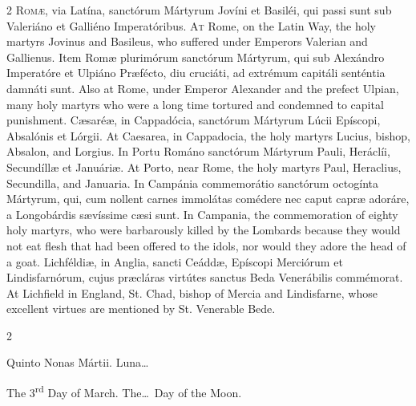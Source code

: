 \begin{paracol}{2}
\lettrine[lines=2]{R}{omæ,} via Latína, sanctórum Mártyrum Jovíni et 
 Basiléi, qui passi sunt sub Valeriáno et Galliéno Imperatóribus.
\switchcolumn
{}
\lettrine[lines=2]{A}{t} Rome, on the Latin Way, the holy martyrs Jovinus and Basileus, who 
 suffered under Emperors Valerian and Gallienus.
\switchcolumn*
{}
Item Romæ plurimórum sanctórum Mártyrum, qui 
 sub Alexándro Imperatóre et Ulpiáno Præfécto, diu cruciáti, ad extrémum 
 capitáli senténtia damnáti sunt.
\switchcolumn
{}
Also at Rome, under Emperor Alexander and the prefect Ulpian, many holy 
 martyrs who were a long time tortured and condemned to capital punishment.
\switchcolumn*
{}
Cæsaréæ, in Cappadócia, sanctórum Mártyrum 
 Lúcii Epíscopi, Absalónis et Lórgii.
\switchcolumn
{}
At Caesarea, in Cappadocia, the holy martyrs Lucius, bishop, Absalon, and 
 Lorgius.
\switchcolumn*
{}
In Portu Románo sanctórum Mártyrum Pauli, Heráclíi, Secundíllæ 
 et Januáriæ.
\switchcolumn
{}
At Porto, near Rome, the holy martyrs Paul, Heraclius, Secundilla, and 
 Januaria.
\switchcolumn*
{}
In Campánia commemorátio sanctórum octogínta Mártyrum, qui, cum nollent 
 carnes immolátas comédere nec caput capræ 
 adoráre, a Longobárdis sævíssime cæsi sunt.
\switchcolumn
{}
In Campania, the commemoration of eighty holy martyrs, who were barbarously 
 killed by the Lombards because they would not eat flesh that had been 
 offered to the idols, nor would they adore the head of a goat.
\switchcolumn*
{}
Lichféldiæ, in Anglia, sancti Ceáddæ, Epíscopi 
 Merciórum et Lindisfarnórum, cujus præcláras virtútes sanctus Beda 
 Venerábilis commémorat.
\switchcolumn
{}
At Lichfield in England, St. Chad, bishop of Mercia and Lindisfarne, whose 
 excellent virtues are mentioned by St. Venerable Bede.
\switchcolumn*
{}
\end{paracol}


\begin{paracol}{2}
\begin{center}{\color{gregoriocolor} Quinto Nonas Mártii. 
 Luna\dots\ }\end{center}
\switchcolumn
{}
\begin{center}{\color{gregoriocolor} The 3\textsuperscript{rd} Day of March. 
 The\dots\ Day of the Moon.}\end{center}
\end{paracol}

